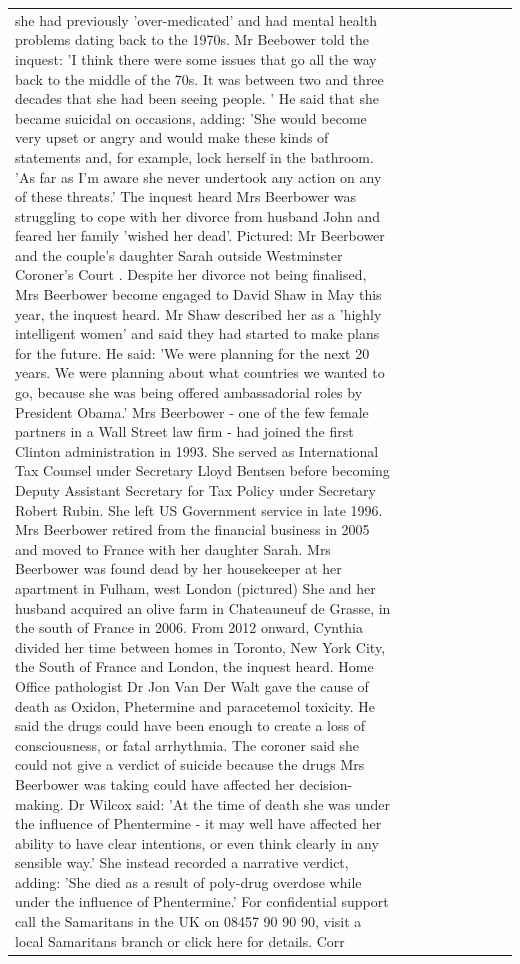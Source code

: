 \begin{table}[H]
\begin{tabular}{lllrlllll}
she had previously 'over-medicated' and had mental health problems dating back to the 1970s. Mr Beebower told the inquest: 'I think there were some issues that go all the way back to the middle of the 70s. It was between two and three decades that she had been seeing people. ' He said that she became suicidal on occasions, adding: 'She would become very upset or angry and would make these kinds of statements and, for example, lock herself in the bathroom. 'As far as I'm aware she never undertook any action on any of these threats.' The inquest heard Mrs Beerbower was struggling to cope with her divorce from husband John and feared her family 'wished her dead'. Pictured: Mr Beerbower and the couple's daughter Sarah outside Westminster Coroner's Court . Despite her divorce not being finalised, Mrs Beerbower become engaged to David Shaw in May this year, the inquest heard. Mr Shaw described her as a 'highly intelligent women' and said they had started to make plans for the future. He said: 'We were planning for the next 20 years. We were planning about what countries we wanted to go, because she was being offered ambassadorial roles by President Obama.' Mrs Beerbower - one of the few female partners in a Wall Street law firm - had joined the first Clinton administration in 1993. She served as International Tax Counsel under Secretary Lloyd Bentsen before becoming Deputy Assistant Secretary for Tax Policy under Secretary Robert Rubin. She left US Government service in late 1996. Mrs Beerbower retired from the financial business in 2005 and moved to France with her daughter Sarah. Mrs Beerbower was found dead by her housekeeper at her apartment in Fulham, west London (pictured) She and her husband acquired an olive farm in Chateauneuf de Grasse, in the south of France in 2006. From 2012 onward, Cynthia divided her time between homes in Toronto, New York City, the South of France and London, the inquest heard. Home Office pathologist Dr Jon Van Der Walt gave the cause of death as Oxidon, Phetermine and paracetemol toxicity. He said the drugs could have been enough to create a loss of consciousness, or fatal arrhythmia. The coroner said she could not give a verdict of suicide because the drugs Mrs Beerbower was taking could have affected her decision-making. Dr Wilcox said: 'At the time of death she was under the influence of Phentermine - it may well have affected her ability to have clear intentions, or even think clearly in any sensible way.' She instead recorded a narrative verdict, adding: 'She died as a result of poly-drug overdose while under the influence of Phentermine.' For confidential support call the Samaritans in the UK on 08457 90 90 90, visit a local Samaritans branch or click here for details. Corr \\

\end{tabular}
\end{table}
